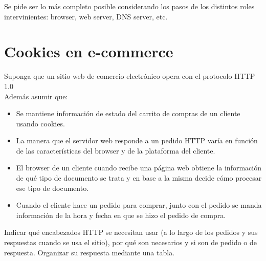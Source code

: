 \documentclass[12pt]{report}
\begin{document}
Se pide ser lo más completo posible considerando los pasos de los distintos roles intervinientes: browser, web server, DNS server, etc.


\section{Cookies en e-commerce \sthree}

Suponga que un sitio web de comercio electrónico opera con el protocolo HTTP 1.0\\Además asumir que:

\begin{itemize}
\item Se mantiene información de estado del carrito de compras de un cliente usando
cookies.
\item La manera que el servidor web responde a un pedido HTTP varía en función de las
características del browser y de la plataforma del cliente.
\item El browser de un cliente cuando recibe una página web obtiene la información de qué
tipo de documento se trata y en base a la misma decide cómo procesar ese tipo de documento.
\item Cuando el cliente hace un pedido para comprar, junto con el pedido se manda
información de la hora y fecha en que se hizo el pedido de compra.
\end{itemize}

Indicar qué encabezados HTTP se necesitan usar (a lo largo de los pedidos y sus respuestas
cuando se usa el sitio), por qué son necesarios y si son de pedido o de respuesta. Organizar su
respuesta mediante una tabla.
\end{document}
